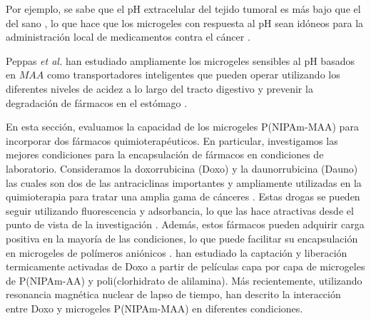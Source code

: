 Por ejemplo, se sabe que el pH extracelular del tejido tumoral es m\'as bajo que el del sano \cite{Gerweck1996}, lo que hace que los microgeles con respuesta al pH sean id\'oneos para la administraci\'on local de medicamentos contra el c\'ancer \cite{Dadsetan2013}.

Peppas \emph{et al.} han estudiado ampliamente los microgeles sensibles al pH basados en $MAA$ como transportadores inteligentes que pueden operar utilizando los diferentes niveles de acidez a lo largo del tracto digestivo y prevenir la degradaci\'on de f\'armacos en el est\'omago \cite{TorresLugo2002, Carr2010, DuranLobato2014, Sharpe2018}.

En esta secci\'on, evaluamos la capacidad de los microgeles P(NIPAm-MAA) para incorporar dos f\'armacos quimioterap\'euticos. En particular, investigamos las mejores condiciones para la encapsulaci\'on de f\'armacos en condiciones de laboratorio. Consideramos la doxorrubicina (Doxo) y la daunorrubicina (Dauno) las cuales son dos de las antraciclinas importantes y ampliamente utilizadas en la quimioterapia para tratar una amplia gama de c\'anceres \cite{Panis2012, Carvalho2009, aubel1984daunorubicin,come1999dual}. Estas drogas se pueden seguir utilizando fluorescencia y adsorbancia, lo que las hace atractivas desde el punto de vista de la investigaci\'on \cite{Serpe2005, ThanHtun2009, PerezChavez2020}. Adem\'as, estos f\'armacos pueden adquirir carga positiva en la mayor\'ia de las condiciones, lo que puede facilitar su encapsulaci\'on en microgeles de pol\'imeros ani\'onicos \cite{Li2019}. \citet{Serpe2005} han estudiado la captaci\'on y liberaci\'on termicamente activadas de Doxo a partir de pel\'iculas capa por capa de microgeles de P(NIPAm-AA) y poli(clorhidrato de alilamina). M\'as recientemente, utilizando resonancia magn\'etica nuclear de lapso de tiempo, \citet{MartinezMoro2020} han descrito la interacci\'on entre Doxo y microgeles P(NIPAm-MAA) en diferentes condiciones.
